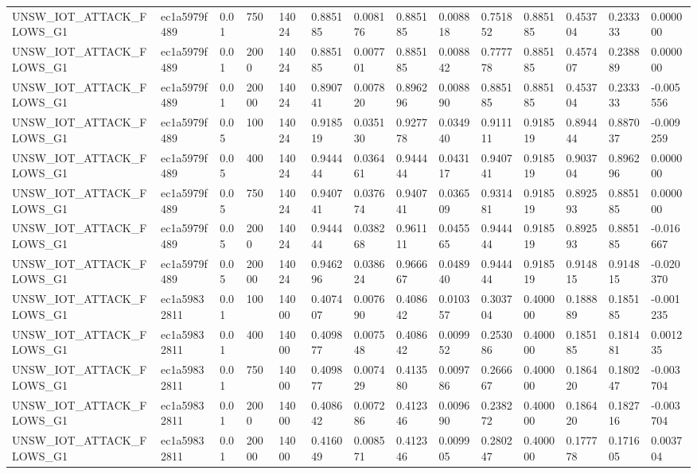 \begin{tabular}{llllllllllllll}
UNSW\_IOT\_ATTACK\_FLOWS\_G1 & ec1a5979f489 & 0.01 & 750 & 14024 & 0.885185 & 0.008176 & 0.885185 & 0.008818 & 0.751852 & 0.885185 & 0.453704 & 0.233333 & 0.000000 \\
UNSW\_IOT\_ATTACK\_FLOWS\_G1 & ec1a5979f489 & 0.01 & 2000 & 14024 & 0.885185 & 0.007701 & 0.885185 & 0.008842 & 0.777778 & 0.885185 & 0.457407 & 0.238889 & 0.000000 \\
UNSW\_IOT\_ATTACK\_FLOWS\_G1 & ec1a5979f489 & 0.01 & 20000 & 14024 & 0.890741 & 0.007820 & 0.896296 & 0.008890 & 0.885185 & 0.885185 & 0.453704 & 0.233333 & -0.005556 \\
UNSW\_IOT\_ATTACK\_FLOWS\_G1 & ec1a5979f489 & 0.05 & 100 & 14024 & 0.918519 & 0.035130 & 0.927778 & 0.034940 & 0.911111 & 0.918519 & 0.894444 & 0.887037 & -0.009259 \\
UNSW\_IOT\_ATTACK\_FLOWS\_G1 & ec1a5979f489 & 0.05 & 400 & 14024 & 0.944444 & 0.036461 & 0.944444 & 0.043117 & 0.940741 & 0.918519 & 0.903704 & 0.896296 & 0.000000 \\
UNSW\_IOT\_ATTACK\_FLOWS\_G1 & ec1a5979f489 & 0.05 & 750 & 14024 & 0.940741 & 0.037674 & 0.940741 & 0.036509 & 0.931481 & 0.918519 & 0.892593 & 0.885185 & 0.000000 \\
UNSW\_IOT\_ATTACK\_FLOWS\_G1 & ec1a5979f489 & 0.05 & 2000 & 14024 & 0.944444 & 0.038268 & 0.961111 & 0.045565 & 0.944444 & 0.918519 & 0.892593 & 0.885185 & -0.016667 \\
UNSW\_IOT\_ATTACK\_FLOWS\_G1 & ec1a5979f489 & 0.05 & 20000 & 14024 & 0.946296 & 0.038624 & 0.966667 & 0.048940 & 0.944444 & 0.918519 & 0.914815 & 0.914815 & -0.020370 \\
UNSW\_IOT\_ATTACK\_FLOWS\_G1 & ec1a59832811 & 0.01 & 100 & 14000 & 0.407407 & 0.007690 & 0.408642 & 0.010357 & 0.303704 & 0.400000 & 0.188889 & 0.185185 & -0.001235 \\
UNSW\_IOT\_ATTACK\_FLOWS\_G1 & ec1a59832811 & 0.01 & 400 & 14000 & 0.409877 & 0.007548 & 0.408642 & 0.009952 & 0.253086 & 0.400000 & 0.185185 & 0.181481 & 0.001235 \\
UNSW\_IOT\_ATTACK\_FLOWS\_G1 & ec1a59832811 & 0.01 & 750 & 14000 & 0.409877 & 0.007429 & 0.413580 & 0.009786 & 0.266667 & 0.400000 & 0.186420 & 0.180247 & -0.003704 \\
UNSW\_IOT\_ATTACK\_FLOWS\_G1 & ec1a59832811 & 0.01 & 2000 & 14000 & 0.408642 & 0.007286 & 0.412346 & 0.009690 & 0.238272 & 0.400000 & 0.186420 & 0.182716 & -0.003704 \\
UNSW\_IOT\_ATTACK\_FLOWS\_G1 & ec1a59832811 & 0.01 & 20000 & 14000 & 0.416049 & 0.008571 & 0.412346 & 0.009905 & 0.280247 & 0.400000 & 0.177778 & 0.171605 & 0.003704 \\

\end{tabular}
